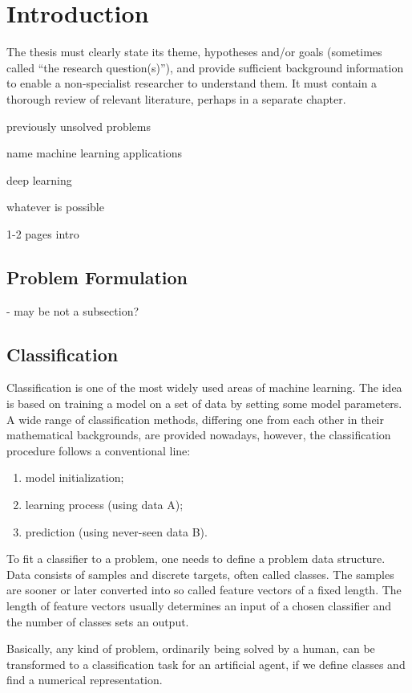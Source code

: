 \chapter{Introduction} \label{chapter:01:introduction}

The thesis must clearly state its theme, hypotheses and/or goals (sometimes called “the research question(s)”), and provide sufficient background information to enable a non-specialist researcher to understand them. It must contain a thorough review of relevant literature, perhaps in a separate chapter.

previously unsolved problems

name machine learning applications

deep learning

whatever is possible

1-2 pages intro

\section{Problem Formulation}
- may be not a subsection?

\newpage
\section{Classification} \label{sec:soa_other_classifiers}
Classification is one of the most widely used areas of machine learning. The idea is based on training a model on a set of data by setting some model parameters. A wide range of classification methods, differing one from each other in their mathematical backgrounds, are provided nowadays, however, the classification procedure follows a conventional line:

\begin{enumerate}
\item model initialization;
\item learning process (using data A);
\item prediction (using never-seen data B).
\end{enumerate}

To fit a classifier to a problem, one needs to define a problem data structure. Data consists of samples and discrete targets, often called classes. The samples are sooner or later converted into so called feature vectors of a fixed length. The length of feature vectors usually determines an input of a chosen classifier and the number of classes sets an output.

Basically, any kind of problem, ordinarily being solved by a human, can be transformed to a classification task for an artificial agent, if we define classes and find a numerical representation.

